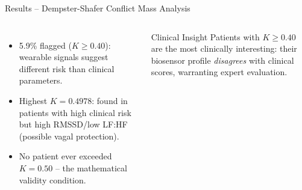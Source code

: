 \documentclass[aspectratio=169]{beamer}
\begin{document}
\begin{frame}{Results -- Dempster-Shafer Conflict Mass Analysis}
\begin{columns}[T]
\begin{itemize}
        \item 5.9\% flagged ($K{\geq}0.40$): wearable signals
              suggest different risk than clinical parameters.
        \item Highest $K{=}0.4978$: found in patients with
              high clinical risk but high RMSSD/low LF:HF
              (possible vagal protection).
        \item No patient ever exceeded $K{=}0.50$ --
              the mathematical validity condition.
      \end{itemize}
      \begin{block}{Clinical Insight}
        Patients with $K{\geq}0.40$ are the most clinically
        interesting: their biosensor profile \emph{disagrees}
        with clinical scores, warranting expert evaluation.
      \end{block}
  \end{columns}
\end{frame}
\end{document}
